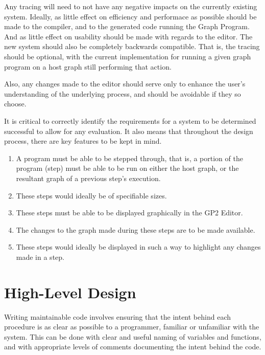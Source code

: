 \documentclass{UoYCSproject}
\begin{document}
Any tracing will need to not have any negative impacts on the currently existing system. Ideally, as little effect on efficiency and performace as possible should be made to the compiler, and to the generated code running the Graph Program. And as little effect on usability should be made with regards to the editor. The new system should also be completely backwards compatible. That is, the tracing should be optional, with the current implementation for running a given graph program on a host graph still performing that action.

Also, any changes made to the editor should serve only to enhance the user's understanding of the underlying process, and should be avoidable if they so choose.

It is critical to correctly identify the requirements for a system to be determined successful to allow for any evaluation. It also means that throughout the design process, there are key features to be kept in mind.
\begin{enumerate}
	\item A program must be able to be stepped through, that is, a portion of the program (step) must be able to be run on either the host graph, or the resultant graph of a previous step's execution.
	\item These steps would ideally be of specifiable sizes.
	\item These steps must be able to be displayed graphically in the GP2 Editor.
	\item The changes to the graph made during these steps are to be made available.
	\item These steps would ideally be displayed in such a way to highlight any changes made in a step.
\end{enumerate}

\section{High-Level Design}
Writing maintainable code involves ensuring that the intent behind each procedure is as clear as possible to a programmer, familiar or unfamiliar with the system. This can be done with clear and useful naming of variables and functions, and with appropriate levels of comments documenting the intent behind the code.
\end{document}
